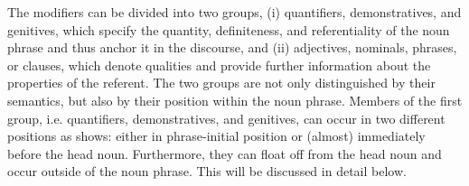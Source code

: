 The modifiers can be divided into two groups, (i) quantifiers, demonstratives, and genitives, which specify the quantity, definiteness, and referentiality of the noun phrase and thus anchor it in the discourse, and (ii) adjectives, nominals, phrases, or clauses, which denote qualities and provide further information about the properties of the referent. The two groups are not only distinguished by their semantics, but also by their position within the noun phrase. Members of the first group, i.e. quantifiers, demonstratives, and genitives, can occur in two different positions as  shows: either in phrase-initial position or (almost) immediately before the head noun. Furthermore, they can float off from the head noun and occur outside of the noun phrase. This will be discussed in detail below.

